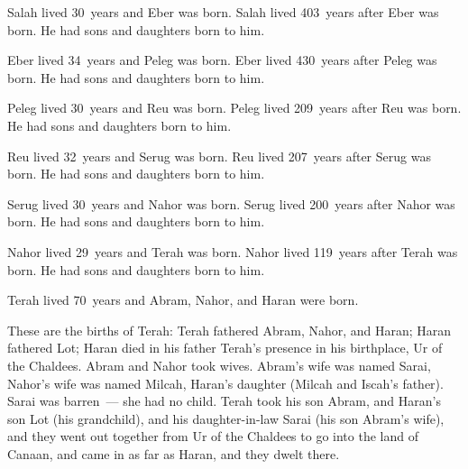 \begin{inparaenum}
     Salah lived 30~years and Eber was born.%
     Salah lived 403~years after Eber was born. He had sons and daughters born to him.%
    
     Eber lived 34~years and Peleg was born.%
     Eber lived 430~years after Peleg was born. He had sons and daughters born to him.%
    
     Peleg lived 30~years and Reu was born.%
     Peleg lived 209~years after Reu was born. He had sons and daughters born to him.%
    
     Reu lived 32~years and Serug was born.%
     Reu lived 207~years after Serug was born. He had sons and daughters born to him.%
    
     Serug lived 30~years and Nahor was born.%
     Serug lived 200~years after Nahor was born. He had sons and daughters born to him.%
    
     Nahor lived 29~years and Terah was born.%
     Nahor lived 119~years after Terah was born. He had sons and daughters born to him.%
    
     Terah lived 70~years and Abram, Nahor, and Haran were born.%
    
     These are the births of Terah: Terah fathered Abram, Nahor, and Haran; Haran fathered Lot;%
     Haran died in his father Terah's presence in his birthplace, Ur of the Chaldees.%
     Abram and Nahor took wives. Abram's wife was named Sarai, Nahor's wife was named Milcah, Haran's daughter (Milcah and Iscah's father).%
     Sarai was barren~--- she had no child.%
     Terah took his son Abram, and Haran's son Lot (his grandchild), and his daughter-in-law Sarai (his son Abram's wife), and they went out together from Ur of the Chaldees to go into the land of Canaan, and came in as far as Haran, and they dwelt there.%
\end{inparaenum}

